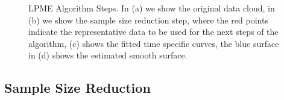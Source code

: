 \documentclass[11pt,reqno]{article}
\theoremstyle{definition}
\begin{document}
\begin{figure}[ht]
  \hfill
  \caption{LPME Algorithm Steps. In (a) we show the original data cloud, in (b) we show the sample size reduction step, where the red points indicate the representative data to be used for the next steps of the algorithm, (c) shows the fitted time specific curves, the blue surface in (d) shows the estimated smooth surface. }
  \label{fig:lpme_steps}
\end{figure}


\subsection*{Sample Size Reduction}
\end{document}
